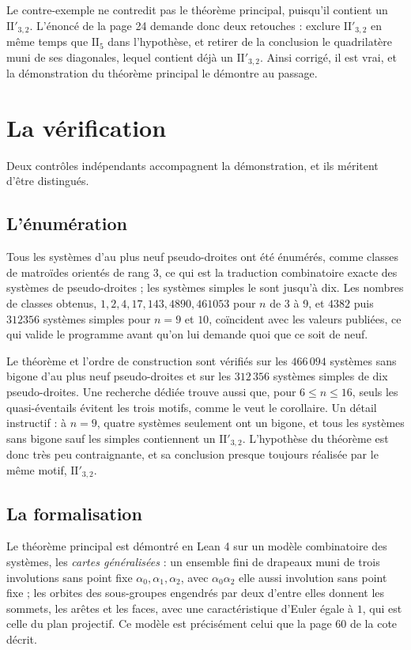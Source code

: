 \documentclass[11pt,a4paper]{amsart}
\theoremstyle{definition}
\theoremstyle{plain}
\theoremstyle{remark}
\newcommand{\II}[1]{\mathrm{II}_{#1}}
\newcommand{\IIp}{\mathrm{II}'_{3,2}}
\begin{document}
Le contre-exemple ne contredit pas le théorème principal, puisqu'il contient un $\IIp$. L'énoncé de la page 24 demande donc deux retouches : exclure $\IIp$ en même temps que $\II5$ dans l'hypothèse, et retirer de la conclusion le quadrilatère muni de ses diagonales, lequel contient déjà un $\IIp$. Ainsi corrigé, il est vrai, et la démonstration du théorème principal le démontre au passage.

\section{La vérification}

Deux contrôles indépendants accompagnent la démonstration, et ils méritent d'être distingués.

\subsection{L'énumération}

Tous les systèmes d'au plus neuf pseudo-droites ont été énumérés, comme classes de matroïdes orientés de rang 3, ce qui est la traduction combinatoire exacte des systèmes de pseudo-droites ; les systèmes simples le sont jusqu'à dix. Les nombres de classes obtenus, $1, 2, 4, 17, 143, 4890, 461053$ pour $n$ de 3 à 9, et $4382$ puis $312356$ systèmes simples pour $n = 9$ et $10$, coïncident avec les valeurs publiées, ce qui valide le programme avant qu'on lui demande quoi que ce soit de neuf.

Le théorème et l'ordre de construction sont vérifiés sur les $466\,094$ systèmes sans bigone d'au plus neuf pseudo-droites et sur les $312\,356$ systèmes simples de dix pseudo-droites. Une recherche dédiée trouve aussi que, pour $6 \le n \le 16$, seuls les quasi-éventails évitent les trois motifs, comme le veut le corollaire. Un détail instructif : à $n = 9$, quatre systèmes seulement ont un bigone, et tous les systèmes sans bigone sauf les simples contiennent un $\IIp$. L'hypothèse du théorème est donc très peu contraignante, et sa conclusion presque toujours réalisée par le même motif, $\IIp$.

\subsection{La formalisation}

Le théorème principal est démontré en Lean 4 sur un modèle combinatoire des systèmes, les \emph{cartes généralisées} : un ensemble fini de drapeaux muni de trois involutions sans point fixe $\alpha_0, \alpha_1, \alpha_2$, avec $\alpha_0\alpha_2$ elle aussi involution sans point fixe ; les orbites des sous-groupes engendrés par deux d'entre elles donnent les sommets, les arêtes et les faces, avec une caractéristique d'Euler égale à $1$, qui est celle du plan projectif. Ce modèle est précisément celui que la page 60 de la cote décrit.
\end{document}
